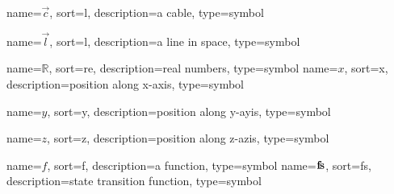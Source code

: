 
\newcommand\Tau{{T}}

	{%
		name=\ensuremath{\vec{c}},
		sort=l,
		description=a cable,
		type=symbol
	}
	\newcommand{\cable}{\gls{sym:cable}}

	{%
		name=\ensuremath{\vec{l}},
		sort=l,
		description=a line in space,
		type=symbol
	}
	\newcommand{\linevec}{\gls{sym:linevec}}

	{%
		name=\ensuremath{\mathds{R}},
		sort=re,
		description=real numbers,
		type=symbol
	}
	\renewcommand{\Re}{\gls{sym:Re}}
	{%
		name=\ensuremath{x},
		sort=x,
		description=position along x-axis,
		type=symbol
	}
	\newcommand{\xcoord}{\gls{sym:xcoord}}

	{%
		name=\ensuremath{y},
		sort=y,
		description=position along y-ayis,
		type=symbol
	}
	\newcommand{\ycoord}{\gls{sym:ycoord}}

	{%
		name=\ensuremath{z},
		sort=z,
		description=position along z-azis,
		type=symbol
	}
	\newcommand{\zcoord}{\gls{sym:zcoord}}

	{%
		name=\ensuremath{f},
		sort=f,
		description=a function,
		type=symbol
	}
	\newcommand{\function}{\gls{sym:function}}
	{%
	name=\ensuremath{\vecfunc{f\!s}},
		sort=fs,
		description=state transition function,
		type=symbol
	}
	\newcommand{\statetransfunc}{\gls{sym:statetransfunc}}

